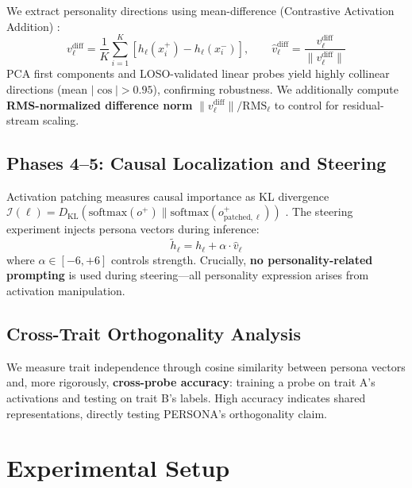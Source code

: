 \documentclass{article}
\begin{document}
We extract personality directions using mean-difference (Contrastive Activation Addition) \citep{rimsky2024steering}:
\begin{equation}\label{eq:meandiff}
v^{\text{diff}}_\ell = \frac{1}{K} \sum_{i=1}^{K} \left[ h_\ell(x^+_i) - h_\ell(x^-_i) \right], \qquad \hat{v}^{\text{diff}}_\ell = \frac{v^{\text{diff}}_\ell}{\|v^{\text{diff}}_\ell\|}
\end{equation}
PCA first components and LOSO-validated linear probes yield highly collinear directions (mean $|\cos| > 0.95$), confirming robustness. We additionally compute \textbf{RMS-normalized difference norm} $\|v^{\text{diff}}_\ell\|/\text{RMS}_\ell$ to control for residual-stream scaling.

\subsection{Phases 4--5: Causal Localization and Steering}\label{sec:localization}

Activation patching measures causal importance as KL divergence $\mathcal{I}(\ell) = D_{\text{KL}}(\text{softmax}(o^+) \| \text{softmax}(o^+_{\text{patched},\ell}))$ \citep{meng2022locating, bao2024emotion}. The steering experiment injects persona vectors during inference:
\begin{equation}\label{eq:steering}
\tilde{h}_\ell = h_\ell + \alpha \cdot \hat{v}_\ell
\end{equation}
where $\alpha \in [-6, +6]$ controls strength. Crucially, \textbf{no personality-related prompting} is used during steering---all personality expression arises from activation manipulation.

\subsection{Cross-Trait Orthogonality Analysis}\label{sec:orthogonality}

We measure trait independence through cosine similarity between persona vectors and, more rigorously, \textbf{cross-probe accuracy}: training a probe on trait A's activations and testing on trait B's labels. High accuracy indicates shared representations, directly testing PERSONA's orthogonality claim.

\section{Experimental Setup}\label{sec:setup}
\end{document}
